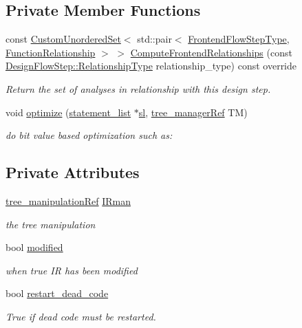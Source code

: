 \subsection*{Private Member Functions}
\begin{DoxyCompactItemize}
\item 
const \hyperlink{classCustomUnorderedSet}{Custom\+Unordered\+Set}$<$ std\+::pair$<$ \hyperlink{frontend__flow__step_8hpp_afeb3716c693d2b2e4ed3e6d04c3b63bb}{Frontend\+Flow\+Step\+Type}, \hyperlink{classFrontendFlowStep_af7cf30f2023e5b99e637dc2058289ab0}{Function\+Relationship} $>$ $>$ \hyperlink{classBit__Value__opt_a8c842c1ab18449cecf5586caef4c7112}{Compute\+Frontend\+Relationships} (const \hyperlink{classDesignFlowStep_a723a3baf19ff2ceb77bc13e099d0b1b7}{Design\+Flow\+Step\+::\+Relationship\+Type} relationship\+\_\+type) const override
\begin{DoxyCompactList}\small\item\em Return the set of analyses in relationship with this design step. \end{DoxyCompactList}\item 
void \hyperlink{classBit__Value__opt_a82c083d2a6a103f4dff51656736635ae}{optimize} (\hyperlink{structstatement__list}{statement\+\_\+list} $\ast$\hyperlink{tutorial__pnnl__2019_2optimizations_2second_2solution_2adpcm_8c_ace9c0991f7fffe6ab436175d7fff821e}{sl}, \hyperlink{tree__manager_8hpp_a96ff150c071ce11a9a7a1e40590f205e}{tree\+\_\+manager\+Ref} TM)
\begin{DoxyCompactList}\small\item\em do bit value based optimization such as\+: \end{DoxyCompactList}\end{DoxyCompactItemize}
\subsection*{Private Attributes}
\begin{DoxyCompactItemize}
\item 
\hyperlink{tree__manipulation_8hpp_a1a9460e3a2f9fc6a96cfd2f24cc9b2a5}{tree\+\_\+manipulation\+Ref} \hyperlink{classBit__Value__opt_a0eaee0b09dbea61b2aab964500f109a1}{I\+Rman}
\begin{DoxyCompactList}\small\item\em the tree manipulation \end{DoxyCompactList}\item 
bool \hyperlink{classBit__Value__opt_aa0f0fd2440aa4867f3a0b942e2715181}{modified}
\begin{DoxyCompactList}\small\item\em when true IR has been modified \end{DoxyCompactList}\item 
bool \hyperlink{classBit__Value__opt_a4ffaa5b4e46c2e2848bfde026f753046}{restart\+\_\+dead\+\_\+code}
\begin{DoxyCompactList}\small\item\em True if dead code must be restarted. \end{DoxyCompactList}\end{DoxyCompactItemize}
